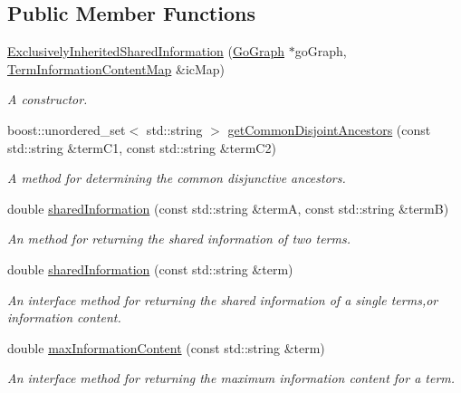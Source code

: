 \subsection*{Public Member Functions}
\begin{DoxyCompactItemize}
\item 
\hyperlink{classExclusivelyInheritedSharedInformation_a176bde96479ad6ea0baba4a520b7038e}{Exclusively\+Inherited\+Shared\+Information} (\hyperlink{classGoGraph}{Go\+Graph} $\ast$go\+Graph, \hyperlink{classTermInformationContentMap}{Term\+Information\+Content\+Map} \&ic\+Map)
\begin{DoxyCompactList}\small\item\em A constructor. \end{DoxyCompactList}\item 
boost\+::unordered\+\_\+set$<$ std\+::string $>$ \hyperlink{classExclusivelyInheritedSharedInformation_a16a51c8f3bd02e6b1e88ebad6faffb5d}{get\+Common\+Disjoint\+Ancestors} (const std\+::string \&term\+C1, const std\+::string \&term\+C2)
\begin{DoxyCompactList}\small\item\em A method for determining the common disjunctive ancestors. \end{DoxyCompactList}\item 
double \hyperlink{classExclusivelyInheritedSharedInformation_ae7e51e7f1328cfc5f7b9991c7714eadf}{shared\+Information} (const std\+::string \&termA, const std\+::string \&termB)
\begin{DoxyCompactList}\small\item\em An method for returning the shared information of two terms. \end{DoxyCompactList}\item 
double \hyperlink{classExclusivelyInheritedSharedInformation_ad77022f2d6225c423fa0c5abb8a1443a}{shared\+Information} (const std\+::string \&term)
\begin{DoxyCompactList}\small\item\em An interface method for returning the shared information of a single terms,or information content. \end{DoxyCompactList}\item 
double \hyperlink{classExclusivelyInheritedSharedInformation_af435c2641f3ab4a34db2d473216ceb16}{max\+Information\+Content} (const std\+::string \&term)
\begin{DoxyCompactList}\small\item\em An interface method for returning the maximum information content for a term. \end{DoxyCompactList}\item 

\end{DoxyCompactItemize}
